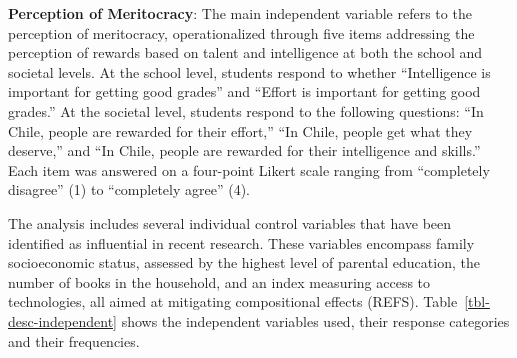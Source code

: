 \documentclass[
  letterpaper,
  DIV=11,
  numbers=noendperiod]{scrartcl}
\begin{document}
\textbf{Perception of Meritocracy}: The main independent variable refers
to the perception of meritocracy, operationalized through five items
addressing the perception of rewards based on talent and intelligence at
both the school and societal levels. At the school level, students
respond to whether ``Intelligence is important for getting good grades''
and ``Effort is important for getting good grades.'' At the societal
level, students respond to the following questions: ``In Chile, people
are rewarded for their effort,'' ``In Chile, people get what they
deserve,'' and ``In Chile, people are rewarded for their intelligence
and skills.'' Each item was answered on a four-point Likert scale
ranging from ``completely disagree'' (1) to ``completely agree'' (4).

The analysis includes several individual control variables that have
been identified as influential in recent research. These variables
encompass family socioeconomic status, assessed by the highest level of
parental education, the number of books in the household, and an index
measuring access to technologies, all aimed at mitigating compositional
effects (REFS). Table~\ref{tbl-desc-independent} shows the independent
variables used, their response categories and their frequencies.
\end{document}
